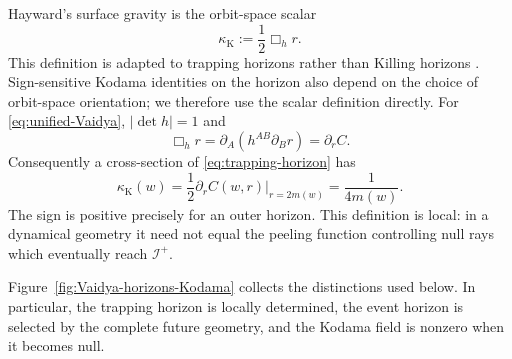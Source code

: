 \documentclass[11pt,a4paper]{article}
\theoremstyle{definition}
\theoremstyle{remark}
\newcommand{\scrI}{\mathscr I}
\begin{document}
	Hayward's surface gravity is the orbit-space scalar
	\begin{equation}
		\kappa_{\mathrm K}:=\frac12\Box_h r.
		\label{eq:Hayward-definition}
	\end{equation}
	This definition is adapted to trapping horizons rather than Killing horizons
	\cite{Hayward1998}.  Sign-sensitive Kodama identities on the horizon also
	depend on the choice of orbit-space orientation; we therefore use the scalar
	definition directly.  For
	\eqref{eq:unified-Vaidya}, $|\det h|=1$ and
	\begin{equation}
		\Box_h r
		=\partial_A(h^{AB}\partial_Br)
		=\partial_r C.
	\end{equation}
	Consequently a cross-section of \eqref{eq:trapping-horizon} has
	\begin{equation}
		\kappa_{\mathrm K}(w)
		=\frac12\left.\partial_r C(w,r)\right|_{r=2m(w)}
		=\frac{1}{4m(w)}.
		\label{eq:Kodama-kappa}
	\end{equation}
	The sign is positive precisely for an outer horizon.  This definition is
	local: in a dynamical geometry it need not equal the peeling function
	controlling null rays which eventually reach $\scrI^+$.
	
	Figure~\ref{fig:Vaidya-horizons-Kodama} collects the distinctions used below.
	In particular, the trapping horizon is locally determined, the event horizon
	is selected by the complete future geometry, and the Kodama field is nonzero
	when it becomes null.
	
\end{document}
